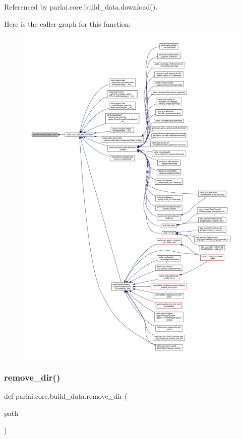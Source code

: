 Referenced by parlai.\+core.\+build\+\_\+data.\+download().

Here is the caller graph for this function\+:
\nopagebreak
\begin{figure}[H]
\begin{center}
\leavevmode
\includegraphics[width=350pt]{namespaceparlai_1_1core_1_1build__data_a1678b8a042eeb9d9c8e9de08f52e496b_icgraph}
\end{center}
\end{figure}
\mbox{\label{namespaceparlai_1_1core_1_1build__data_a24ab3b7e68e41adf774df058d330ff33}} 
\subsubsection{\texorpdfstring{remove\+\_\+dir()}{remove\_dir()}}
{\footnotesize\ttfamily def parlai.\+core.\+build\+\_\+data.\+remove\+\_\+dir (\begin{DoxyParamCaption}\item[{}]{path }\end{DoxyParamCaption})}

